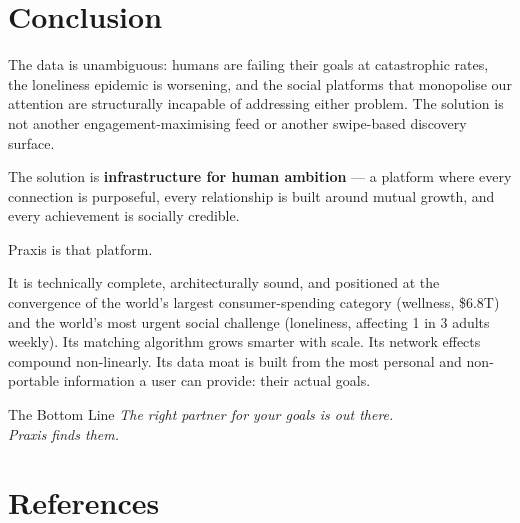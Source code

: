 \documentclass[11pt,a4paper]{article}
\begin{document}
\section{Conclusion}

The data is unambiguous: humans are failing their goals at catastrophic rates, the loneliness epidemic is worsening, and the social platforms that monopolise our attention are structurally incapable of addressing either problem. The solution is not another engagement-maximising feed or another swipe-based discovery surface.

The solution is \textbf{infrastructure for human ambition} — a platform where every connection is purposeful, every relationship is built around mutual growth, and every achievement is socially credible.

Praxis is that platform.

It is technically complete, architecturally sound, and positioned at the convergence of the world's largest consumer-spending category (wellness, \$6.8T) and the world's most urgent social challenge (loneliness, affecting 1 in 3 adults weekly). Its matching algorithm grows smarter with scale. Its network effects compound non-linearly. Its data moat is built from the most personal and non-portable information a user can provide: their actual goals.

\bigskip

\begin{calloutbox}{The Bottom Line}
\centering
\Large
\textit{The right partner for your goals is out there.}\\[6pt]
\textit{Praxis finds them.}
\end{calloutbox}

\newpage
\section*{References}
\end{document}
